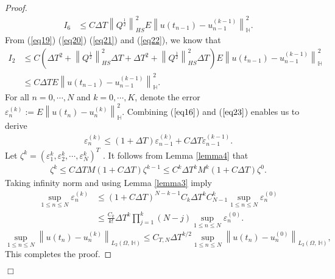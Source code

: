 \documentclass[preprint,12pt]{elsarticle}
\newtheorem{proof}{Proof}
\begin{document}
\begin{proof}
	\begin{align}\label{eq22}
		I_{6}&\leq C\Delta T\left\|Q^{\frac{1}{2}}\right\|_{HS}^2 E\left\|u(t_{n-1})-u_{n-1}^{(k-1)}\right\|_{\mathbb{H}}^2.
	\end{align}
	From (\ref{eq19}) (\ref{eq20}) (\ref{eq21}) and (\ref{eq22}), we know that
	\begin{align}\label{eq23}
		I_{2}&\leq C(\Delta T^2+\left\|Q^{\frac{1}{2}}\right\|_{HS}^2\Delta  T+\Delta T^2+\left\|Q^{\frac{1}{2}}\right\|_{HS}^2\Delta T)E\left\|u(t_{n-1})-u_{n-1}^{(k-1)}\right\|_{\mathbb{H}}^2\nonumber\\
		&\leq C\Delta TE\left\|u(t_{n-1})-u_{n-1}^{(k-1)}\right\|_{\mathbb{H}}^2.
	\end{align}
	For all $n=0, \cdots, N$ and $k=0, \cdots, K$, denote the error $\varepsilon _{n}^{(k)}:=E\left\|u(t_{n})-u_{n}^{(k)}\right\|_{\mathbb{H}}^2$.
	Combining ($\ref{eq16}$) and ($\ref{eq23}$) enables us to derive
	\begin{align*}
		\varepsilon _{n}^{(k)}\leq(1+\Delta T)\varepsilon _{n-1}^{(k)}+C\Delta T\varepsilon _{n-1}^{(k-1)}.
	\end{align*}
	Let $\zeta^{k}=(\varepsilon_1^{k},\varepsilon_2^{k},\cdots,\varepsilon_{N}^{k})^{T}$ . It follows from Lemma \ref{lemma4} that 
	\begin{align*}
		\zeta^{k}\leq C\Delta T M(1+C\Delta T)\zeta^{k-1}\leq C^{k} \Delta T^{k} M^{k}(1+C\Delta T)\zeta^{0}.
	\end{align*}
	Taking infinity norm and using Lemma \ref{lemma3} imply 
	\begin{align*}
		\sup\limits_{1\leq n \leq N}	\varepsilon _{n}^{(k)} &\leq(1+C\Delta T)^{N-k-1}C_{k}\Delta T^{k} C_{N-1}^{k}\sup\limits_{1\leq n \leq N}	\varepsilon _{n}^{(0)}\\
		&\leq \frac{C_{k}}{k!} \Delta T^{k} \prod \limits_{j=1}^k (N-j)\sup\limits_{1\leq n \leq N}	\varepsilon _{n}^{(0)}.			 
	\end{align*}
	\begin{equation*}
		\sup\limits_{1\leq n \leq N}\left\|u(t_{n})-u_{n}^{(k)}\right\|_{L_{2}(\Omega,\,\mathbb{H})} \leq C_{T,N}\Delta T^{k/2} \sup\limits_{1\leq n \leq N}\left\|u(t_{n})-u_{n}^{(0)}\right\|_{L_{2}(\Omega,\, \mathbb{H})},
	\end{equation*}
	This completes the proof.
\end{proof}
\hfill $\Box$
\end{document}
